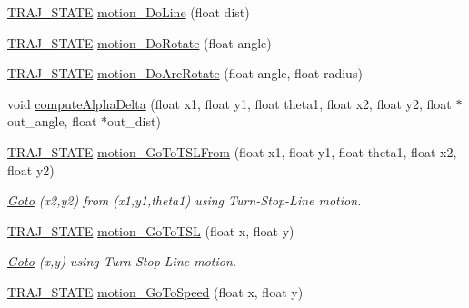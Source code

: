 \begin{DoxyCompactItemize}
\item 
\hyperlink{path__manager_8h_adb3360abeb29758da93865c8afcb80eb}{T\+R\+A\+J\+\_\+\+S\+T\+A\+TE} \hyperlink{classAsservInsa_a3cb6f1cf5557851312a8398b79514905}{motion\+\_\+\+Do\+Line} (float dist)
\item 
\hyperlink{path__manager_8h_adb3360abeb29758da93865c8afcb80eb}{T\+R\+A\+J\+\_\+\+S\+T\+A\+TE} \hyperlink{classAsservInsa_ab45e49759207b2ba9abcb17b1d567abf}{motion\+\_\+\+Do\+Rotate} (float angle)
\item 
\hyperlink{path__manager_8h_adb3360abeb29758da93865c8afcb80eb}{T\+R\+A\+J\+\_\+\+S\+T\+A\+TE} \hyperlink{classAsservInsa_aa254f5473381b147ddaa536a1187fd5c}{motion\+\_\+\+Do\+Arc\+Rotate} (float angle, float radius)
\item 
void \hyperlink{classAsservInsa_af139b79d3547a044dbf921e5984bc3cd}{compute\+Alpha\+Delta} (float x1, float y1, float theta1, float x2, float y2, float $\ast$out\+\_\+angle, float $\ast$out\+\_\+dist)
\item 
\mbox{\label{classAsservInsa_ad92a1afe85121d55bce7551cfab80bf5}} 
\hyperlink{path__manager_8h_adb3360abeb29758da93865c8afcb80eb}{T\+R\+A\+J\+\_\+\+S\+T\+A\+TE} \hyperlink{classAsservInsa_ad92a1afe85121d55bce7551cfab80bf5}{motion\+\_\+\+Go\+To\+T\+S\+L\+From} (float x1, float y1, float theta1, float x2, float y2)
\begin{DoxyCompactList}\small\item\em \hyperlink{classGoto}{Goto} (x2,y2) from (x1,y1,theta1) using Turn-\/\+Stop-\/\+Line motion. \end{DoxyCompactList}\item 
\mbox{\label{classAsservInsa_a878ef9649b7358b14adda88f336b9aab}} 
\hyperlink{path__manager_8h_adb3360abeb29758da93865c8afcb80eb}{T\+R\+A\+J\+\_\+\+S\+T\+A\+TE} \hyperlink{classAsservInsa_a878ef9649b7358b14adda88f336b9aab}{motion\+\_\+\+Go\+To\+T\+SL} (float x, float y)
\begin{DoxyCompactList}\small\item\em \hyperlink{classGoto}{Goto} (x,y) using Turn-\/\+Stop-\/\+Line motion. \end{DoxyCompactList}\item 
\mbox{\label{classAsservInsa_aade6e14a6fab69dd1f42391f5ca212ae}} 
\hyperlink{path__manager_8h_adb3360abeb29758da93865c8afcb80eb}{T\+R\+A\+J\+\_\+\+S\+T\+A\+TE} \hyperlink{classAsservInsa_aade6e14a6fab69dd1f42391f5ca212ae}{motion\+\_\+\+Go\+To\+Speed} (float x, float y)

\end{DoxyCompactItemize}
